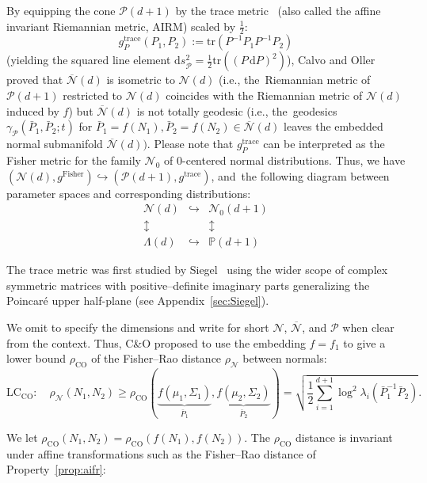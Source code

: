 \documentclass[entropy,article,accept,oneauthor,pdftex,entropy]{Definitions/mdpi}
\def\bbP{\mathbb{P}}
\def\dP{\mathrm{d}P}
\def\trace{\mathrm{trace}}
\def\barN{{\overline{\mathcal{N}}}}
\def\dP{\mathrm{d}P}
\def\CO{\mathrm{CO}}
\def\Fisher{\mathrm{Fisher}}
\def\tr{\mathrm{tr}}
\def\calN{\mathcal{N}}
\def\calP{\mathcal{P}}
\def\barP{{\bar P}}
\def\ds{\mathrm{d}s}
\begin{document}
By equipping the cone $\calP(d+1)$ by the trace metric~\cite{moakher2011riemannian,EllipticIsometrySPD-2021} (also called the affine invariant Riemannian metric, AIRM) scaled by $\frac{1}{2}$: 
$$
g_P^\trace(P_1,P_2):=\tr(P^{-1}P_1P^{-1}P_2)
$$ 
 (yielding the squared line element $\ds_\calP^2=\frac{1}{2}\tr((P\,\dP)^2)$),
Calvo and Oller~\cite{SDPMVN-1990} proved that $\barN(d)$ is isometric to $\calN(d)$ (i.e., the~Riemannian metric of $\calP(d+1)$ restricted to $\calN(d)$ coincides with the Riemannian metric of $\calN(d)$ induced by $f$) but $\barN(d)$ is not totally geodesic (i.e., the~geodesics $\gamma_\calP(\barP_1,\barP_2;t)$ for $\barP_1=f(N_1),\barP_2=f(N_2)\in\barN(d)$ leaves the embedded normal submanifold $\barN(d))$.
Please note that $g_P^\trace$ can be interpreted as the Fisher metric for the family $\calN_0$ of $0$-centered normal distributions.
Thus, we have $(\calN(d),g^\Fisher)\hookrightarrow (\calP(d+1),g^\trace)$, and~the following diagram between parameter spaces and corresponding distributions:
$$
\begin{array}{ccc}
\calN(d) & \hookrightarrow  &\calN_0(d+1)\\
\updownarrow & & \updownarrow\\
\Lambda(d) & \hookrightarrow & \bbP(d+1)
\end{array}
$$



\begin{Remark}
The trace metric was first studied by Siegel~\cite{siegel2014symplectic,nielsen2020siegel} using the wider scope of complex symmetric matrices with positive–definite imaginary parts generalizing the Poincar\'e upper half-plane (see Appendix~\ref{sec:Siegel}).
\end{Remark}



We omit to specify the dimensions and write for short $\calN$, $\barN$, and $\calP$  when clear from the context.
Thus, C\&O proposed to use the embedding $f=f_{1}$ to give a lower bound $\rho_\CO$ of the Fisher–Rao distance $\rho_\calN$ between normals:
\begin{equation}
\mathrm{LC}_\CO:\quad \rho_{\calN}(N_1,N_2)\geq \rho_{\CO}(\underbrace{f(\mu_1,\Sigma_1)}_{\barP_1},\underbrace{f(\mu_2,\Sigma_2)}_{\barP_2})=
\sqrt{\frac{1}{2}\sum_{i=1}^{d+1} \log^2 \lambda_i(\barP_1^{-1}\barP_2)}.
\end{equation}

We let $\rho_{\CO}(N_1,N_2)=\rho_\CO(f(N_1),f(N_2))$.
The $\rho_\CO$ distance is invariant under affine transformations such as the Fisher–Rao distance of Property~\ref{prop:aifr}:
\end{document}

